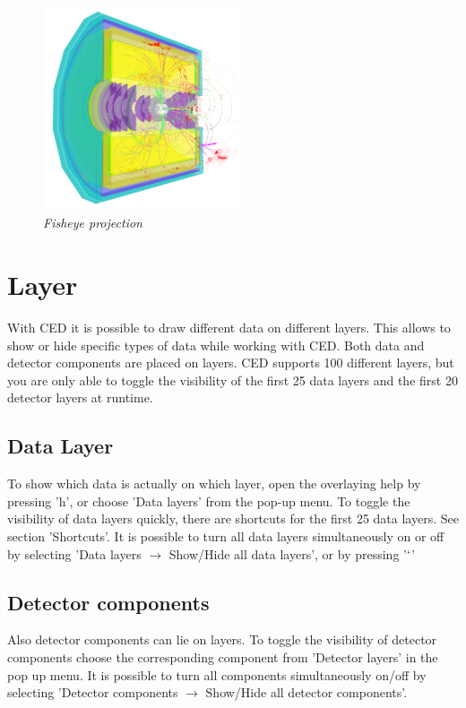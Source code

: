 \documentclass[a4paper,10pt]{article}
\begin{document}
\begin{figure}[h]
\centerline{ \includegraphics[height=6cm]{fisheye1.png}}
\caption{\label{CEDViewer} \textsl{Fisheye projection}}
\end{figure}

\section{Layer}
With CED it is possible to draw different data on different layers. This allows to show or hide specific types of data while working with CED. Both data and detector components are placed on layers. CED supports 100 different layers, but you are only able to toggle the visibility of the first 25 data layers and the first 20 detector layers at runtime. 

\subsection{Data Layer}
To show which data is actually on which layer, open the overlaying help by pressing 'h', or choose 'Data layers' from the pop-up menu. To toggle the visibility of data layers quickly, there are shortcuts for the first 25 data layers. See section 'Shortcuts'. 
\newline\newline
It is possible to turn all data layers simultaneously on or off by selecting 'Data layers $\rightarrow$ Show/Hide all data layers', or by pressing '$`$'

\subsection{Detector components}
Also detector components can lie on layers. To toggle the visibility of detector components choose the corresponding component from 'Detector layers' in the pop up menu. It is possible to turn all components simultaneously on/off by selecting 'Detector components $\rightarrow$ Show/Hide all detector components'. 
\end{document}
